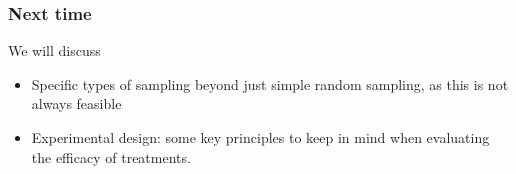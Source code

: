 \documentclass[handout]{beamer}
\newcommand{\blue}[1]{\textcolor{blue2}{#1}}
\begin{document}
\begin{frame}
\frametitle{Next time}

We will discuss 
\begin{itemize}
\item Specific types of sampling beyond just \blue{simple random sampling}, as this is not always feasible
\pause\item Experimental design:  some key principles to keep in mind when evaluating the efficacy of treatments. 
\end{itemize}

\end{frame}
\end{document}
